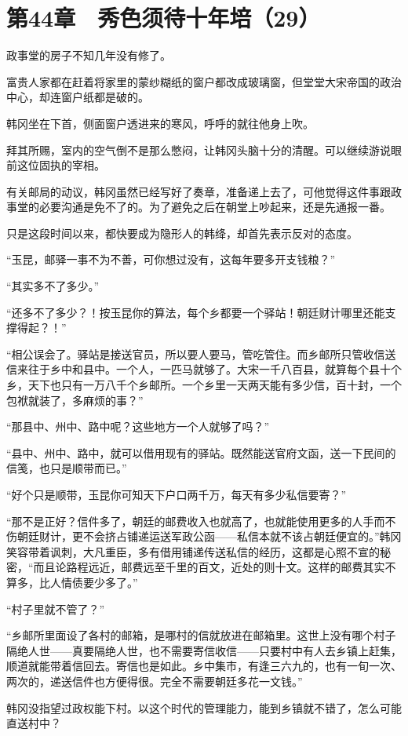 \section{第44章　秀色须待十年培（29）}

政事堂的房子不知几年没有修了。

富贵人家都在赶着将家里的蒙纱糊纸的窗户都改成玻璃窗，但堂堂大宋帝国的政治中心，却连窗户纸都是破的。

韩冈坐在下首，侧面窗户透进来的寒风，呼呼的就往他身上吹。

拜其所赐，室内的空气倒不是那么憋闷，让韩冈头脑十分的清醒。可以继续游说眼前这位固执的宰相。

有关邮局的动议，韩冈虽然已经写好了奏章，准备递上去了，可他觉得这件事跟政事堂的必要沟通是免不了的。为了避免之后在朝堂上吵起来，还是先通报一番。

只是这段时间以来，都快要成为隐形人的韩绛，却首先表示反对的态度。

“玉昆，邮驿一事不为不善，可你想过没有，这每年要多开支钱粮？”

“其实多不了多少。”

“还多不了多少？！按玉昆你的算法，每个乡都要一个驿站！朝廷财计哪里还能支撑得起？！”

“相公误会了。驿站是接送官员，所以要人要马，管吃管住。而乡邮所只管收信送信来往于乡中和县中。一个人，一匹马就够了。大宋一千八百县，就算每个县十个乡，天下也只有一万八千个乡邮所。一个乡里一天两天能有多少信，百十封，一个包袱就装了，多麻烦的事？”

“那县中、州中、路中呢？这些地方一个人就够了吗？”

“县中、州中、路中，就可以借用现有的驿站。既然能送官府文函，送一下民间的信笺，也只是顺带而已。”

“好个只是顺带，玉昆你可知天下户口两千万，每天有多少私信要寄？”

“那不是正好？信件多了，朝廷的邮费收入也就高了，也就能使用更多的人手而不伤朝廷财计，更不会挤占铺递运送军政公函——私信本就不该占朝廷便宜的。”韩冈笑容带着讽刺，大凡重臣，多有借用铺递传送私信的经历，这都是心照不宣的秘密，“而且论路程远近，邮费远至千里的百文，近处的则十文。这样的邮费其实不算多，比人情债要少多了。”

“村子里就不管了？”

“乡邮所里面设了各村的邮箱，是哪村的信就放进在邮箱里。这世上没有哪个村子隔绝人世——真要隔绝人世，也不需要寄信收信——只要村中有人去乡镇上赶集，顺道就能带着信回去。寄信也是如此。乡中集市，有逢三六九的，也有一旬一次、两次的，递送信件也方便得很。完全不需要朝廷多花一文钱。”

韩冈没指望过政权能下村。以这个时代的管理能力，能到乡镇就不错了，怎么可能直送村中？

